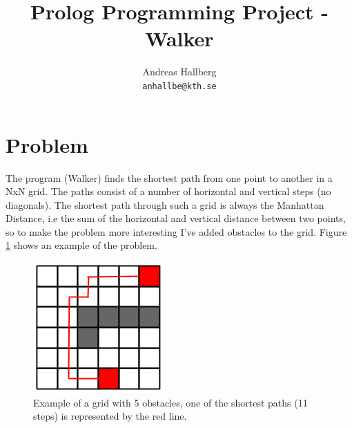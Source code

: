 \documentclass[a4paper]{article}
\title{Prolog Programming Project - Walker}
\author{Andreas Hallberg \\ \texttt{anhallbe@kth.se}}
\begin{document}
\maketitle

\section{Problem}
The program (Walker) finds the shortest path from one point to another in a NxN grid. The paths consist of a number of horizontal and vertical steps (no diagonals). The shortest path through such a grid is always the Manhattan Distance, i.e the sum of the horizontal and vertical distance between two points, so to make the problem more interesting I've added obstacles to the grid. Figure \ref{grid} shows an example of the problem.

\begin{figure}
\centering
	\includegraphics[scale=0.6]{prolog_grid}
	\caption{Example of a grid with 5 obstacles, one of the shortest paths (11 steps) is represented by the red line.}
	\label{grid}
\end{figure}
\FloatBarrier
\end{document}
